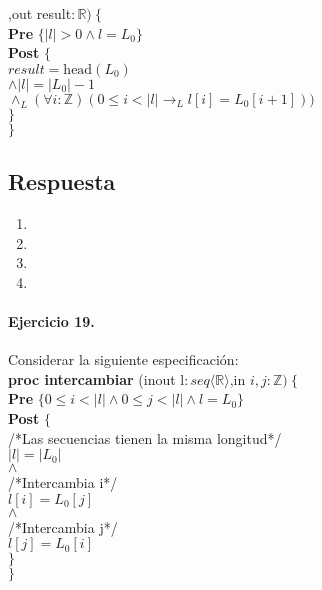 \documentclass[a4paper]{article}
\begin{document}
\begin{enumerate}[label=\alph*)]
			,out result$:\mathbb{R})\ \{$\smallskip \\
			\hspace*{6mm} \textbf{Pre }$\{ |l|> 0\wedge l=L_0\}$\smallskip \\
			\hspace*{6mm} \textbf{Post }$\{$\\
			\hspace*{6mm} $result=\textrm{head}(L_0)$\\
			\hspace*{6mm} $\wedge |l|=|L_0|-1$\\
			\hspace*{6mm} $\wedge_L (\forall i:\mathbb{Z})(0\leq i < |l|
						\rightarrow_L l[i]=L_0[i+1]))$\\
			\hspace*{6mm}$\}$\\
			$\}$
	\end{enumerate}
\subsection*{Respuesta}
	\begin{enumerate}[label=\alph*)]
		\item
		\item
		\item
		\item
	\end{enumerate}

\paragraph*{Ejercicio 19.} Considerar la siguiente especificación:\medskip \\

			\textbf{proc intercambiar }(inout l$: seq\langle
				 \mathbb{R}\rangle$,in $i,j:\mathbb{Z})
			\ \{$\smallskip \\
			\hspace*{6mm} \textbf{Pre }$\{0\leq i<|l|
					\wedge 0\leq j<|l|\wedge l=L_0\}$\\
			\hspace*{6mm} \textbf{Post }$\{$\\
			\hspace*{6mm} /*Las secuencias tienen la misma longitud*/\\
			\hspace*{6mm} $|l|=|L_0|$\\
			\hspace*{6mm} $\wedge$\\
			\hspace*{6mm} /*Intercambia i*/\\
			\hspace*{6mm} $l[i]=L_0[j]$\\
			\hspace*{6mm} $\wedge$\\
			\hspace*{6mm} /*Intercambia j*/\\
			\hspace*{6mm} $l[j]=L_0[i]$\\
			\hspace*{6mm} $\}$\\
			$\}$
			
\end{document}
